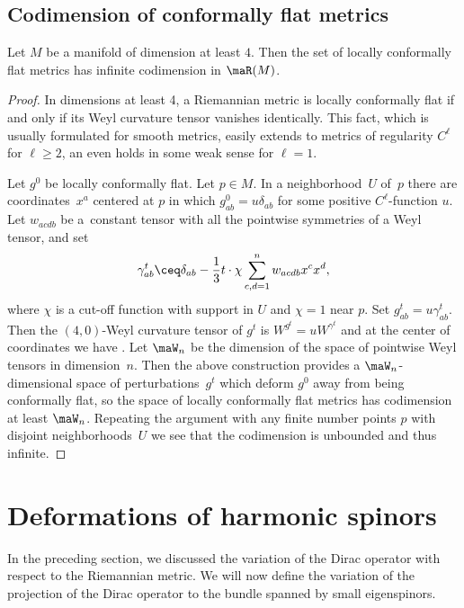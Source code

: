 \subsection{Codimension of conformally flat metrics}

\begin{Proposition} \label{prop.CF.codim}
Let $M$ be a manifold of dimension at least $4$. Then the set of locally conformally flat metrics has infinite codimension in $\maR(M)$.
\end{Proposition}

\begin{proof}
 In dimensions at least 4, a Riemannian metric is locally conformally flat if and only if its Weyl curvature tensor vanishes identically.
 This fact, which is usually formulated for smooth metrics, easily extends to metrics of regularity $C^\ell$ for $\ell\geq 2$, an even holds in some weak sense for $\ell=1$.

Let $g^0$ be locally conformally flat. Let $ p \in M$. In a neighborhood~$U$ of~$p$ there are coordinates~$x^a$ centered at $p$ in which $g^0_{ab} = u \delta_{ab}$ for some positive $C^\ell$-function $u$. Let $w_{acdb}$ be a~constant tensor with all the pointwise symmetries of a Weyl tensor, and set
\[
\gamma^t_{ab} \ceq \delta_{ab} - \frac{1}{3} t \cdot \chi \sum_{c,d=1}^n w_{acdb} x^c x^d,
\]
where $\chi$ is a cut-off function with support in $U$ and $\chi=1$ near $p$. Set $g^t_{ab} = u \gamma^t_{ab}$. Then the $(4,0)$-Weyl curvature tensor of $g^t$ is $W^{g^t} = u W^{\gamma^t}$ and at the center of coordinates we have . Let $\maW_n$ be the dimension of the space of pointwise Weyl tensors in dimension~$n$. Then the above construction provides a $\maW_n$-dimensional space of perturbations~$g^t$ which deform $g^0$ away from being conformally flat, so the space of locally conformally flat metrics has codimension at least $\maW_n$. Repeating the argument with any finite number points $p$ with disjoint neighborhoods~$U$ we see that the codimension is unbounded and thus infinite.
\end{proof}

\section{Deformations of harmonic spinors}\label{sec.def.harm.spinors}

In the preceding section, we discussed the variation of the Dirac operator with respect to the Riemannian metric. We will now define the variation of the projection of the Dirac operator to the bundle spanned by small eigenspinors.


